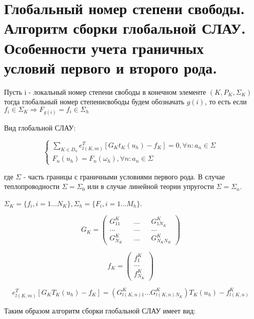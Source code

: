 \documentclass[__main__.tex]{subfiles}
\begin{document}
\section{Глобальный номер степени свободы. Алгоритм сборки глобальной СЛАУ. Особенности учета граничных условий первого и второго рода.}

\begin{definition}
	Пусть i - локальный номер степени свободы в конечном элементе $\left(K, P_K, \Sigma_K\right)$ тогда глобальный номер степенисвободы будем обозначать $g\left(i\right)$, то есть если $f_i \in \Sigma_K \Rightarrow F_{g\left(i\right)} = f_i \in \Sigma_h$
\end{definition}

Вид глобальной СЛАУ:

\begin{equation*}
\begin{cases}
\sum_{K \in D_n} e^T_{l\left(K,m\right)}\left[G_K t_K \left(u_h\right) - f_K\right] = 0, \forall n: a_n \in \Sigma\\
F_n\left(u_h\right) = F_n \left(\omega_h\right), \forall n: a_n \in \Sigma
\end{cases}
\end{equation*}

где $\Sigma$ - часть границы с граничными условиями первого рода. В случае теплопроводности $\Sigma = \Sigma_0$ или в случае линейной теории упругости $\Sigma = \Sigma_n$.

$\Sigma_K = \{ f_i, i=1...N_K \}, \Sigma_h = \{F_i, i = 1... M_h\}$.

$$
G_K = \left(
\begin{matrix}
G^K_{11} && ... && G^K_{1N_K} \\
... && ... && ... \\
G^K_{N_K} && ... && G^K_{N_K N_K}
\end{matrix}
\right)
$$

$$
f_K = \left(
\begin{matrix}
f^K_1 \\
... \\
f^K_{N_K}
\end{matrix}
\right)
$$

$$
e^T_{l\left(K,m\right)} \left[G_K T_K \left(u_h\right) - f_K\right] = \left(G^K_{l\left(K,n\right) 1} ... G^K_{l\left(K,n\right) N_K}\right) T_K \left(u_h\right) - f^K_{l\left(K,n\right)}
$$

Таким образом алгоритм сборки глобальной СЛАУ имеет вид:
\end{document}

